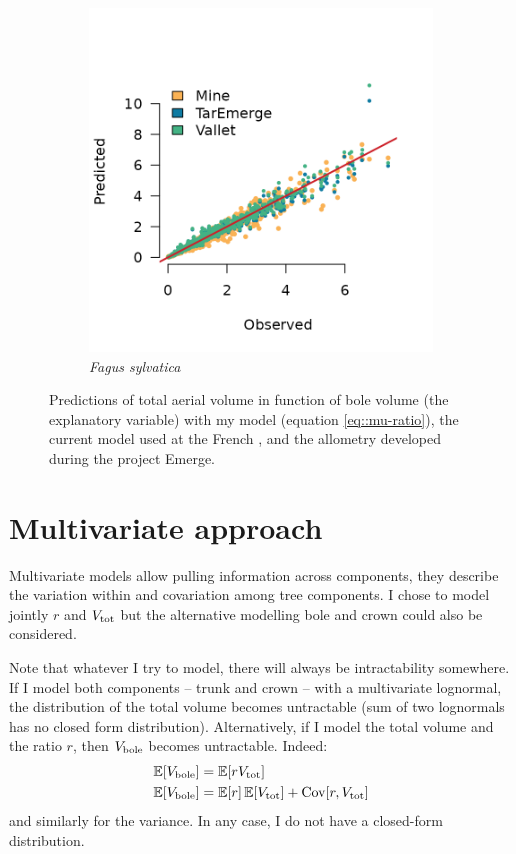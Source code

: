 \begin{figure}[h]
\begin{subfigure}{0.4\textwidth}
		\includegraphics{./Figures/fagSyl-pred.png}
		\caption{\textit{Fagus sylvatica}}
	\end{subfigure}
	\caption{Predictions of total aerial volume in function of bole volume (the explanatory variable) with my model (equation \eqref{eq::mu-ratio}), the current model used at the French \NFI \parencite{Vallet2006}, and the allometry developed during the project Emerge.}
	\label{fig::pred-ratio}
\end{figure}

\section{Multivariate approach}

Multivariate models allow pulling information across components, \ie they describe the variation within and covariation among tree components. I chose to model jointly \( r \) and \( V_{\text{tot}} \) but the alternative modelling bole and crown could also be considered.

\begin{tcolorbox}[breakable, title = Intractability]
Note that whatever I try to model, there will always be intractability somewhere. If I model both components -- trunk and crown -- with a multivariate lognormal, the distribution of the total volume becomes untractable (sum of two lognormals has no closed form distribution). Alternatively, if I model the total volume and the ratio \( r \), then \( V_{\text{bole}} \) becomes untractable. Indeed:
\begin{align*}
	\operatorname{\mathbb{E}}[V_{\text{bole}}] &= \operatorname{\mathbb{E}}[r V_{\text{tot}}] \\
	\operatorname{\mathbb{E}}[V_{\text{bole}}] &= \operatorname{\mathbb{E}}[r] \operatorname{\mathbb{E}}[V_{\text{tot}}] + \operatorname{Cov}[r, V_{\text{tot}}]
\end{align*}
and similarly for the variance. In any case, I do not have a closed-form distribution.
\end{tcolorbox}

